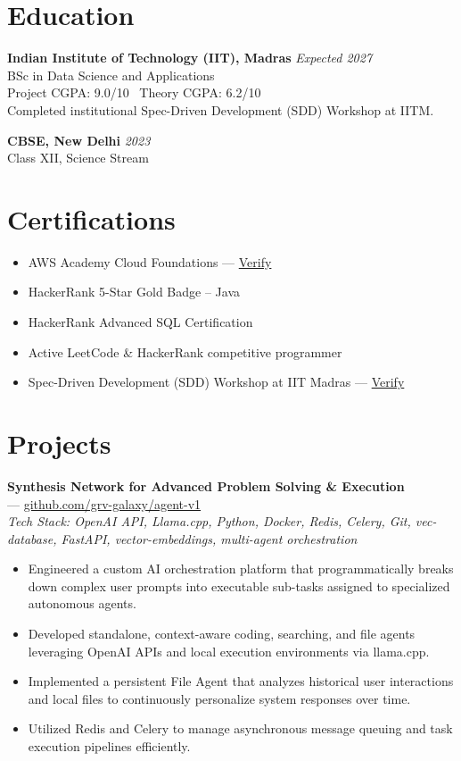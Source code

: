 \documentclass[10.5pt,a4paper]{article}
\newcommand{\subheading}[3]{
  \textbf{#1} \hfill \textit{#2} \\
  #3 \\
}
\begin{document}
\section*{Education}
\subheading{Indian Institute of Technology (IIT), Madras}{Expected 2027}{BSc in Data Science and Applications}
Project CGPA: 9.0/10 \textbar\ Theory CGPA: 6.2/10\\
Completed institutional Spec-Driven Development (SDD) Workshop at IITM.

\vspace{2pt}
\subheading{CBSE, New Delhi}{2023}{Class XII, Science Stream}

\section*{Certifications}
\begin{itemize}[leftmargin=*, itemsep=1pt, topsep=1pt]
    \item AWS Academy Cloud Foundations --- \href{https://www.credly.com/users/gaurav-thakur.ba8fd441/badges}{Verify}
    \item HackerRank 5-Star Gold Badge -- Java
    \item HackerRank Advanced SQL Certification
    \item Active LeetCode \& HackerRank competitive programmer
    \item Spec-Driven Development (SDD) Workshop at IIT Madras --- \href{https://drive.google.com/file/d/1ym5jUN-M2reXOwdNatP2ak6bfGrIMXz8/view?usp=sharing}{Verify}
\end{itemize}

\section*{Projects}

\textbf{Synthesis Network for Advanced Problem Solving & Execution}\\ --- \href{https://github.com/grv-galaxy/agent-v1}{github.com/grv-galaxy/agent-v1}\\
\textit{Tech Stack: OpenAI API, Llama.cpp, Python, Docker, Redis, Celery, Git, vec-database, FastAPI, vector-embeddings, multi-agent orchestration}
\begin{itemize}[leftmargin=*, itemsep=1pt, topsep=1pt]
    \item Engineered a custom AI orchestration platform that programmatically breaks down complex user prompts into executable sub-tasks assigned to specialized autonomous agents.
    \item Developed standalone, context-aware coding, searching, and file agents leveraging OpenAI APIs and local execution environments via llama.cpp.
    \item Implemented a persistent File Agent that analyzes historical user interactions and local files to continuously personalize system responses over time.
    \item Utilized Redis and Celery to manage asynchronous message queuing and task execution pipelines efficiently.
\end{itemize}
\end{document}
